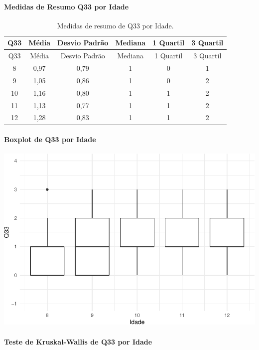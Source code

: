 \documentclass[]{article}
\let\oldparagraph\paragraph
\renewcommand{\paragraph}[1]{\oldparagraph{#1}\mbox{}}
\begin{document}
\cleardoublepage

\hypertarget{medidas-de-resumo-q33-por-idade}{%
\paragraph{Medidas de Resumo Q33 por Idade}\label{medidas-de-resumo-q33-por-idade}}

\begin{longtable}[]{@{}cccccc@{}}
\caption{\label{tab:unnamed-chunk-1158}Medidas de resumo de Q33 por Idade.}\tabularnewline
\toprule
Q33 & Média & Desvio Padrão & Mediana & 1 Quartil & 3 Quartil\tabularnewline
\midrule
\endfirsthead
\toprule
Q33 & Média & Desvio Padrão & Mediana & 1 Quartil & 3 Quartil\tabularnewline
\midrule
\endhead
8 & 0,97 & 0,79 & 1 & 0 & 1\tabularnewline
9 & 1,05 & 0,86 & 1 & 0 & 2\tabularnewline
10 & 1,16 & 0,80 & 1 & 1 & 2\tabularnewline
11 & 1,13 & 0,77 & 1 & 1 & 2\tabularnewline
12 & 1,28 & 0,83 & 1 & 1 & 2\tabularnewline
\bottomrule
\end{longtable}

\hypertarget{boxplot-de-q33-por-idade}{%
\paragraph{Boxplot de Q33 por Idade}\label{boxplot-de-q33-por-idade}}

\begin{center}\includegraphics[width=0.75\linewidth]{relatorio_covid19_files/figure-latex/unnamed-chunk-1159-1} \end{center}

\hypertarget{teste-de-kruskal-wallis-de-q33-por-idade}{%
\paragraph{Teste de Kruskal-Wallis de Q33 por Idade}\label{teste-de-kruskal-wallis-de-q33-por-idade}}
\end{document}
